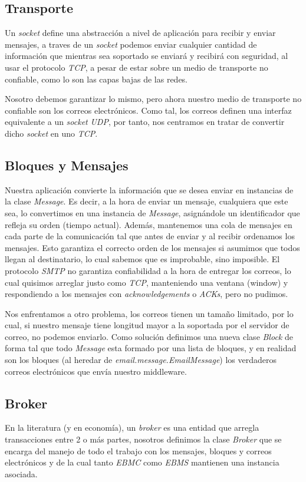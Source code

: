 \documentclass[a4paper]{article}
\begin{document}
	\subsection{Transporte}\label{subsec:transporte}
	Un \emph{socket} define una abstracción a nivel de aplicación para recibir y enviar mensajes, a traves de un \emph{socket} podemos enviar cualquier cantidad de información que mientras sea soportado se enviará y recibirá con seguridad, al usar el protocolo \emph{TCP}, a pesar de estar sobre un medio de transporte no confiable, como lo son las capas bajas de las redes.
	
	Nosotro debemos garantizar lo mismo, pero ahora nuestro medio de transporte no confiable son los correos electrónicos.
	Como tal, los correos definen una interfaz equivalente a un \emph{socket} \emph{UDP}, por tanto, nos centramos en tratar de convertir dicho \emph{socket} en uno \emph{TCP}.
	
	\subsection{Bloques y Mensajes}\label{subsec:bloques-y-mensajes}
	Nuestra aplicación convierte la información que se desea enviar en instancias de la clase \emph{Message}.
	Es decir, a la hora de enviar un mensaje, cualquiera que este sea, lo convertimos en una instancia de \emph{Message}, asignándole un identificador que refleja su orden (tiempo actual).
	Además, mantenemos una cola de mensajes en cada parte de la comunicación tal que antes de enviar y al recibir ordenamos los mensajes.
	Esto garantiza el correcto orden de los mensajes si asumimos que todos llegan al destinatario, lo cual sabemos que es improbable, sino imposible.
	El protocolo \emph{SMTP} no garantiza confiabilidad a la hora de entregar los correos, lo cual quisimos arreglar justo como \emph{TCP}, manteniendo una ventana (window) y respondiendo a los mensajes con \emph{acknowledgements} o \emph{ACKs}, pero no pudimos.
	
	Nos enfrentamos a otro problema, los correos tienen un tamaño limitado, por lo cual, si nuestro mensaje tiene longitud mayor a la soportada por el servidor de correo, no podemos enviarlo.
	Como solución definimos una nueva clase \emph{Block} de forma tal que todo \emph{Message} esta formado por una lista de bloques, y en realidad son los bloques (al heredar de \emph{email.message.EmailMessage}) los verdaderos correos electrónicos que envía nuestro middleware.
	
	\subsection{Broker}\label{subsec:broker}
	En la literatura (y en economía), un \emph{broker} es una entidad que arregla transacciones entre 2 o más partes, nosotros definimos la clase \emph{Broker} que se encarga del manejo de todo el trabajo con los mensajes, bloques y correos electrónicos y de la cual tanto \emph{EBMC} como \emph{EBMS} mantienen una instancia asociada.
	
\end{document}
